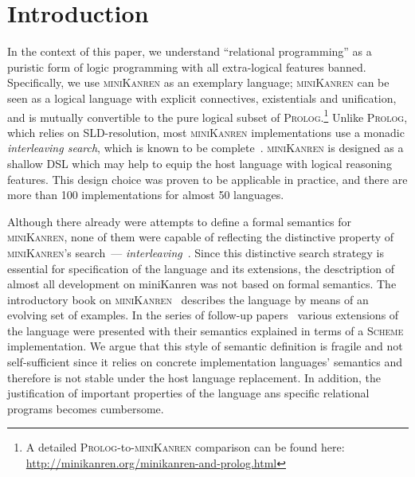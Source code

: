 \section{Introduction}

In the context of this paper, we understand ``relational programming'' as a puristic form of logic programming with all extra-logical
features banned. Specifically, we use \textsc{miniKanren} as an exemplary language; \textsc{miniKanren} can be seen as
a logical language with explicit connectives, existentials and unification, and is mutually convertible to the pure logical subset of
\textsc{Prolog}.\footnote{A detailed \textsc{Prolog}-to-\textsc{miniKanren} comparison can be found here: \url{http://minikanren.org/minikanren-and-prolog.html}}
Unlike \textsc{Prolog}, which relies on SLD-resolution, most \textsc{miniKanren} implementations use a monadic \emph{interleaving
search}, which is known to be complete~\cite{2016}.
\textsc{miniKanren} is designed as a shallow DSL which may help to equip the host language with logical reasoning features. This
design choice was proven to be applicable in practice, and there are more than 100 implementations for almost 50 languages.

Although there already were attempts to define a formal semantics for \textsc{miniKanren}, none of them were capable of reflecting the distinctive property of \textsc{miniKanren}'s search~--- \emph{interleaving}~\cite{Search}.
Since this distinctive search strategy is essential for specification of the language and its extensions, the desctription of almost all development on miniKanren was not based on formal semantics.
The introductory book on \textsc{miniKanren}~\cite{TRS} describes the language by means of an evolving set of examples. In the
series of follow-up papers~\cite{MicroKanren,CKanren,CKanren1,AlphaKanren,2016,Guided} various extensions of the language were presented with
their semantics explained in terms of a \textsc{Scheme} implementation. We argue that this style of semantic definition is
fragile and not self-sufficient since it relies on concrete implementation languages' semantics and therefore is not stable under the host language replacement.
In addition, the justification of important properties of the language ans specific relational programs becomes cumbersome.

\begin{comment}
There were some previous attempts to define a formal semantics for \textsc{miniKanren}. In~\cite{MechanisingMiniKanren} formal definitions
for denotational and non-deterministic operational semantics were given and the soundness result was proven; the development was mechanized in HOL. 
\cite{RelConversion} presented a variant of nondeterministic operational semantics, and~\cite{DivTest} used another variant of finite-set semantics.
None of the previous approaches were capable of reflecting the distinctive property of \textsc{miniKanren}'s search~--- \emph{interleaving}~\cite{Search},
thus deviating from the conventional understanding of the language.
\end{comment}

